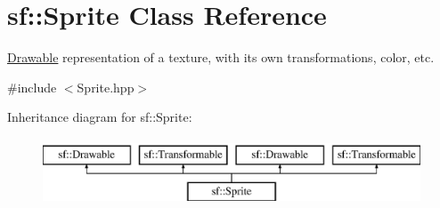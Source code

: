 \hypertarget{classsf_1_1_sprite}{\section{sf\-:\-:Sprite Class Reference}
\label{classsf_1_1_sprite}
}


\hyperlink{classsf_1_1_drawable}{Drawable} representation of a texture, with its own transformations, color, etc.  




{\ttfamily \#include $<$Sprite.\-hpp$>$}

Inheritance diagram for sf\-:\-:Sprite\-:\begin{figure}[H]
\begin{center}
\leavevmode
\includegraphics[height=2.000000cm]{classsf_1_1_sprite}
\end{center}
\end{figure}
